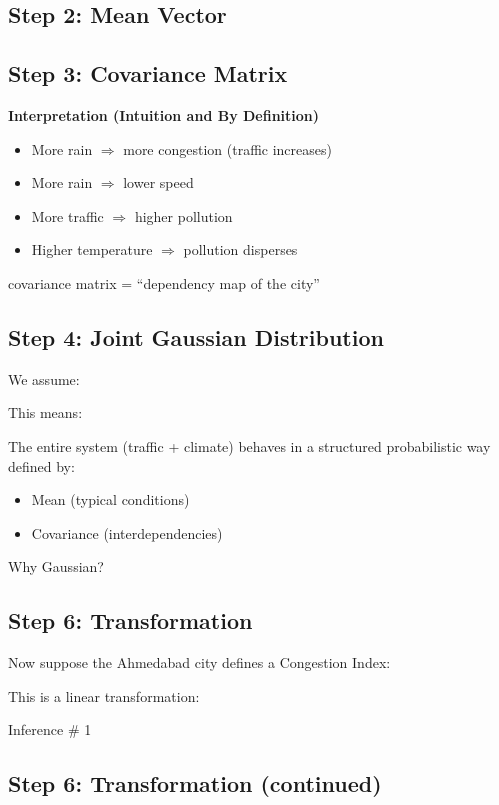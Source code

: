 \documentclass[12pt]{article}
\begin{document}
\subsection*{Step 2: Mean Vector}

\subsection*{Step 3: Covariance Matrix}

\textbf{Interpretation (Intuition and By Definition)}

\begin{itemize}
    \item More rain $\Rightarrow$ more congestion (traffic increases)
    \item More rain $\Rightarrow$ lower speed
    \item More traffic $\Rightarrow$ higher pollution
    \item Higher temperature $\Rightarrow$ pollution disperses
\end{itemize}

covariance matrix = “dependency map of the city”

\subsection*{Step 4: Joint Gaussian Distribution}

We assume:

This means:

The entire system (traffic + climate) behaves in a structured probabilistic way defined by:

\begin{itemize}
    \item Mean (typical conditions)
    \item Covariance (interdependencies)
\end{itemize}

Why Gaussian?

\subsection*{Step 6: Transformation}

Now suppose the Ahmedabad city defines a Congestion Index:

This is a linear transformation:

Inference \# 1

\subsection*{Step 6: Transformation (continued)}
\end{document}
